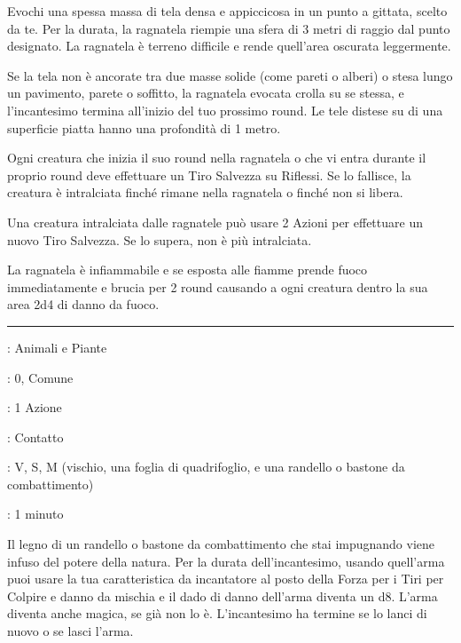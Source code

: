 \begin{multicols}{2}
Evochi una spessa massa di tela densa e appiccicosa in un punto a gittata, scelto da te. Per la durata, la ragnatela riempie una sfera di 3 metri di raggio dal punto designato. La ragnatela è terreno difficile e rende quell'area oscurata leggermente.

Se la tela non è ancorate tra due masse solide (come pareti o alberi) o stesa lungo un pavimento, parete o soffitto, la ragnatela evocata crolla su se stessa, e l'incantesimo termina all'inizio del tuo prossimo round. Le tele distese su di una superficie piatta hanno una profondità di 1 metro.

Ogni creatura che inizia il suo round nella ragnatela o che vi entra durante il proprio round deve effettuare un Tiro Salvezza su Riflessi. Se lo fallisce, la creatura è intralciata finché rimane nella ragnatela o finché non si libera.

Una creatura intralciata dalle ragnatele può usare 2 Azioni per effettuare un nuovo Tiro Salvezza. Se lo supera, non è più intralciata.

La ragnatela è infiammabile e se esposta alle fiamme prende fuoco immediatamente e brucia per 2 round causando a ogni creatura dentro la sua area 2d4 di danno da fuoco.

\smallskip\noindent\rule{\linewidth}{2pt} \hypertarget{Randello Incantato}{}\medskip{}
\noindent
\begin{description}[noitemsep, topsep=0pt, parsep=0pt, partopsep=0pt, leftmargin=0cm, labelwidth=2.8cm]
	\item[\textbf{Lista di Magia}]: Animali e Piante
	\item[\textbf{Livello}]: 0, Comune
	\item[\textbf{T. di Lancio}]: 1 Azione
	\item[\textbf{Gittata}]: Contatto
	\item[\textbf{Componenti}]: V, S, M (vischio, una foglia di quadrifoglio, e una randello o bastone da combattimento)
	\item[\textbf{Durata}]: 1 minuto
\end{description}

Il legno di un randello o bastone da combattimento che stai impugnando viene infuso del potere della natura. Per la durata dell'incantesimo, usando quell'arma puoi usare la tua caratteristica da incantatore al posto della Forza per i Tiri per Colpire e danno da mischia e il dado di danno dell'arma diventa un d8. L'arma diventa anche magica, se già non lo è. L'incantesimo ha termine se lo lanci di nuovo o se lasci l'arma.


\end{multicols}
